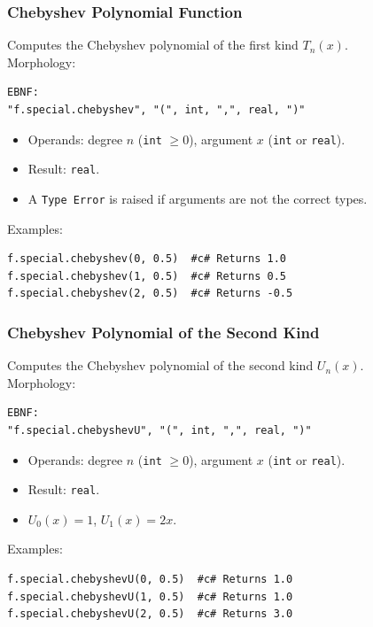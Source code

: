 \subsubsection{Chebyshev Polynomial Function}
Computes the Chebyshev polynomial of the first kind $T_n(x)$. \\
Morphology:
\begin{verbatim}
EBNF:
"f.special.chebyshev", "(", int, ",", real, ")"
\end{verbatim}
\begin{itemize}
\item Operands: degree $n$ (\texttt{int} $\geq 0$), argument $x$ (\texttt{int} or \texttt{real}).
\item Result: \texttt{real}.
\item A \texttt{Type Error} is raised if arguments are not the correct types.
\end{itemize}
Examples:
\begin{verbatim}
f.special.chebyshev(0, 0.5)  #c# Returns 1.0
f.special.chebyshev(1, 0.5)  #c# Returns 0.5
f.special.chebyshev(2, 0.5)  #c# Returns -0.5
\end{verbatim}

\subsubsection{Chebyshev Polynomial of the Second Kind}
Computes the Chebyshev polynomial of the second kind $U_n(x)$. \\
Morphology:
\begin{verbatim}
EBNF:
"f.special.chebyshevU", "(", int, ",", real, ")"
\end{verbatim}
\begin{itemize}
\item Operands: degree $n$ (\texttt{int} $\geq 0$), argument $x$ (\texttt{int} or \texttt{real}).
\item Result: \texttt{real}.
\item $U_0(x) = 1$, $U_1(x) = 2x$.
\end{itemize}
Examples:
\begin{verbatim}
f.special.chebyshevU(0, 0.5)  #c# Returns 1.0
f.special.chebyshevU(1, 0.5)  #c# Returns 1.0
f.special.chebyshevU(2, 0.5)  #c# Returns 3.0
\end{verbatim}

